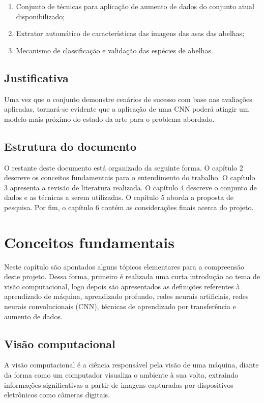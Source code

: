 \documentclass[
	12pt,				%
	oneside,			%
	a4paper,			%
	english,			%
	brazil				%
	]{abntex2ppgsi}
\begin{document}
\begin{enumerate}
  \item Conjunto de técnicas para aplicação de aumento de dados do conjunto atual disponibilizado;
  \item Extrator automático de características das imagens das asas das abelhas;
  \item Mecanismo de classificação e validação das espécies de abelhas.
\end{enumerate}

\section{Justificativa}
Uma vez que o conjunto demonstre cenários de sucesso com base nas avaliações aplicadas, tornará-se evidente que a aplicação de uma CNN poderá atingir um modelo mais próximo do estado da arte para o problema abordado.

\section{Estrutura do documento}
O restante deste documento está organizado da seguinte forma. O capítulo 2 descreve os conceitos fundamentais para o entendimento do trabalho. O capítulo 3 apresenta a revisão de literatura realizada. O capítulo 4 descreve o conjunto de dados e as técnicas a serem utilizadas. O capítulo 5 aborda a proposta de pesquisa. Por fim, o capítulo 6 contém as considerações finais acerca do projeto.

\chapter{Conceitos fundamentais}
Neste capítulo são apontados alguns tópicos elementares para a compreensão deste projeto. Dessa forma, primeiro é realizada uma curta introdução ao tema de visão computacional, logo depois são apresentados as definições referentes à aprendizado de máquina, aprendizado profundo, redes neurais artificiais, redes neurais convolucionais (CNN), técnicas de aprendizado por transferência e aumento de dados.

\section{Visão computacional}
A visão computacional é a ciência responsável pela visão de uma máquina, diante da forma como um computador visualiza o ambiente à sua volta, extraindo informações significativas a partir de imagens capturadas por dispositivos eletrônicos como câmeras digitais. 
\end{document}
